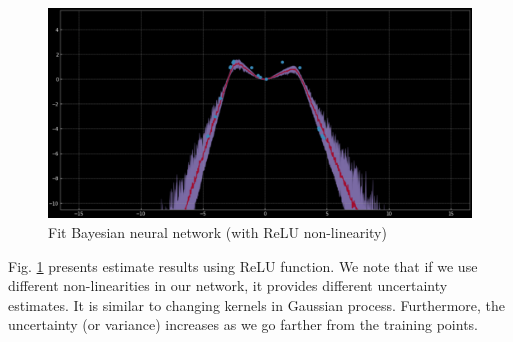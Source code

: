 \begin{figure}[H]
    \centering
    \includegraphics[width=\textwidth]{figs/exp_4.png}
    \caption{Fit Bayesian neural network (with ReLU non-linearity)}
    \label{fig:fit_BayesianNN_ReLU}
\end{figure}

Fig. \ref{fig:fit_BayesianNN_ReLU} presents estimate results using ReLU function. We note that if we use different non-linearities in our network, it provides different uncertainty estimates. It is similar to changing kernels in Gaussian process. Furthermore, the uncertainty (or variance) increases as we go farther from the training points. 
